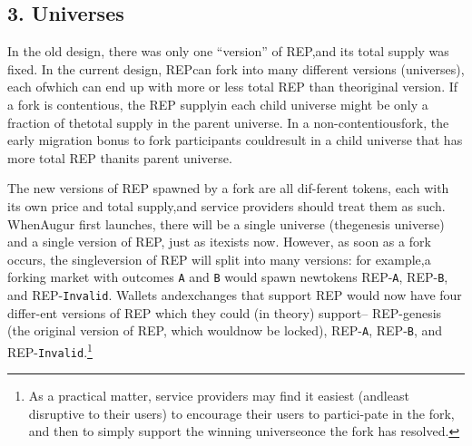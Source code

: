 \documentclass[12pt,floatfix,reprint,nofootinbib,amsmath,amssymb,epsfig,pre,floats,letterpaper,groupedaffiliation]{revtex4-1}
\theoremstyle{definition}
\theoremstyle{definition}
\begin{document}
\subsection*{3. Universes}

In the old design, there was only one ``version'' of REP,\linebreak and its total supply was fixed. In the current design, REP\linebreak can fork into many different versions (universes), each of\linebreak which can end up with more or less total REP than the\linebreak original version. If a fork is contentious, the REP supply\linebreak in each child universe might be only a fraction of the\linebreak total supply in the parent universe. In a non-contentious\linebreak fork, the early migration bonus to fork participants could\linebreak result in a child universe that has more total REP than\linebreak its parent universe.

The new versions of REP spawned by a fork are all dif-\linebreak ferent tokens, each with its own price and total supply,\linebreak and service providers should treat them as such. When\linebreak Augur first launches, there will be a single universe (the\linebreak genesis universe) and a single version of REP, just as it\linebreak exists now. However, as soon as a fork occurs, the single\linebreak version of REP will split into many versions: for example,\linebreak a forking market with outcomes \texttt{A} and \texttt{B} would spawn new\linebreak tokens REP-\texttt{A}, REP-\texttt{B}, and REP-\texttt{Invalid}. Wallets and\linebreak exchanges that support REP would now have four differ-\linebreak ent versions of REP which they could (in theory) support\linebreak -- REP-genesis (the original version of REP, which would\linebreak now be locked), REP-\texttt{A}, REP-\texttt{B}, and REP-\texttt{Invalid}.\footnote{As a practical matter, service providers may find it easiest (and\linebreak least disruptive to their users) to encourage their users to partici-\linebreak pate in the fork, and then to simply support the winning universe\linebreak once the fork has resolved.}
\end{document}

